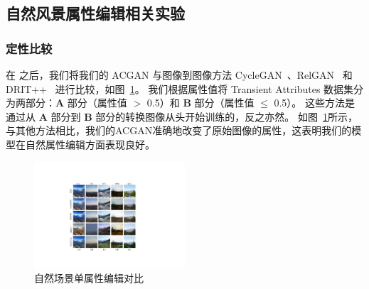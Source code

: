 \subsection{自然风景属性编辑相关实验}

\subsubsection{定性比较}
在 \cite{iclr2021} 之后，我们将我们的 ACGAN 与图像到图像方法 CycleGAN~\cite{cyclegan}、RelGAN~\cite{relgan} 和 DRIT++~\cite{drit++} 进行比较，如图~\ref{fig:sceneComparison}。 我们根据属性值将 Transient Attributes 数据集分为两部分：\textbf{A} 部分（属性值 $>$ 0.5）和 \textbf{B} 部分（属性值 $\leq$ 0.5）。 这些方法是通过从 \textbf{A} 部分到 \textbf{B} 部分的转换图像从头开始训练的，反之亦然。
如图~\ref{fig:sceneComparison}所示，与其他方法相比，我们的ACGAN准确地改变了原始图像的属性，这表明我们的模型在自然属性编辑方面表现良好。

\begin{figure}[t]
    \begin{center}
         \includegraphics[width=0.5\textwidth]{figures/ACGAN/Scenecomparison.pdf}
    \end{center}
    \caption{自然场景单属性编辑对比}
    \label{fig:sceneComparison}
\end{figure}

